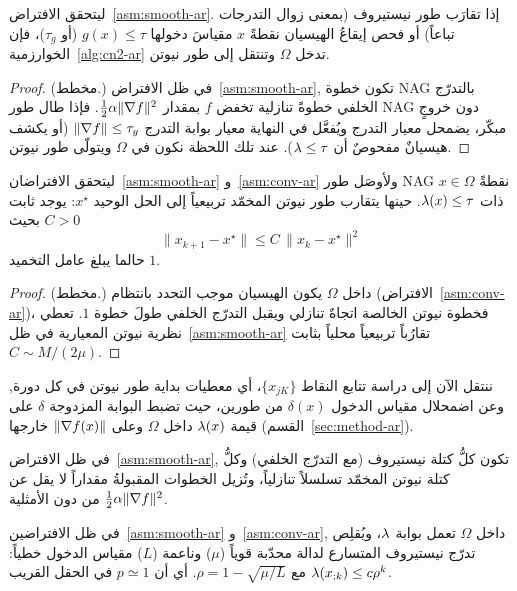 \begin{theorem}
\label{thm:enter-ar}
ليتحقق الافتراض~\ref{asm:smooth-ar}. إذا تقارَب طور نيستيروف (بمعنى زوال التدرجات تباعاً)
أو فحص إيقاعُ الهيسيان نقطةً $x$ مقياسَ دخولها $g(x)\le \tau$ (أو $\tau_g$)، فإن
الخوارزمية~\ref{alg:cn2-ar} تدخل $\Omega$ وتنتقل إلى طور نيوتن.
\end{theorem}

\begin{proof}
(مخطط.) في ظل الافتراض~\ref{asm:smooth-ar}, تكون خطوة NAG بالتدرّج الخلفي خطوةً تنازلية
تخفض $f$ بمقدار $\tfrac12\alpha\|\nabla f\|^2$. فإذا طال طور NAG دون خروجٍ مبكّر، يضمحل
معيار التدرج ويُفعَّل في النهاية معيار بوابة التدرج $\|\nabla f\|\le\tau_g$ (أو يكشف
هيسيانٌ مفحوصٌ أن $\lambda\le\tau$). عند تلك اللحظة نكون في $\Omega$ ويتولّى طور نيوتن.
\end{proof}

\begin{theorem}
\label{thm:quad-ar}
ليتحقق الافتراضان~\ref{asm:smooth-ar} و~\ref{asm:conv-ar} ولأوصَل طور NAG نقطةً $x\in\Omega$
ذات $\lambda(x)\le\tau$. حينها يتقارب طور نيوتن المخمّد تربيعياً إلى الحل الوحيد $x^\star$:
يوجد ثابت $C>0$ بحيث
\[
\|x_{k+1}-x^\star\|\le C\,\|x_k-x^\star\|^2
\]
حالما يبلغ عامل التخميد $1$.
\end{theorem}

\begin{proof}
(مخطط.) داخل $\Omega$ يكون الهيسيان موجب التحدد بانتظام (الافتراض~\ref{asm:conv-ar})،
فخطوة نيوتن الخالصة اتجاهٌ تنازلي ويقبل التدرّج الخلفي طولَ خطوة $1$. تعطي نظرية نيوتن
المعيارية في ظل~\ref{asm:smooth-ar} تقارُباً تربيعياً محلياً بثابت $C\sim M/(2\mu)$.
\end{proof}

ننتقل الآن إلى دراسة تتابع النقاط $\{x_{jK}\}$، أي معطيات بداية طور نيوتن في كل دورة,
وعن اضمحلال مقياس الدخول $\delta(x)$ من طورين، حيث تضبط البوابة المزدوجة $\delta$ على
قيمة $\lambda(x)$ داخل $\Omega$ وعلى $\|\nabla f(x)\|$ خارجها (القسم~\ref{sec:method-ar}).

\begin{lemma}
\label{lem:descent-ar}
في ظل الافتراض~\ref{asm:smooth-ar}, تكون كلُّ كتلة نيستيروف (مع التدرّج الخلفي) وكلُّ كتلة
نيوتن المخمّد تسلسلاً تنازلياً، وتُزيل الخطوات المقبولةُ مقداراً لا يقل عن
$\tfrac12\alpha\|\nabla f\|^2$ من دون الأمثلية.
\end{lemma}

\begin{lemma}
\label{lem:linear-ar}
في ظل الافتراضين~\ref{asm:smooth-ar} و~\ref{asm:conv-ar}, داخل $\Omega$ تعمل بوابة $\lambda$،
ويُقلِص تدرّج نيستيروف المتسارع لدالة محدّبة قوياً ($\mu$) وناعمة ($L$) مقياس الدخول خطياً:
$\lambda(x_{;k})\le c\rho^k$ مع $\rho=1-\sqrt{\mu/L}$. أي أن $p\simeq1$ في الحقل القريب.
\end{lemma}

